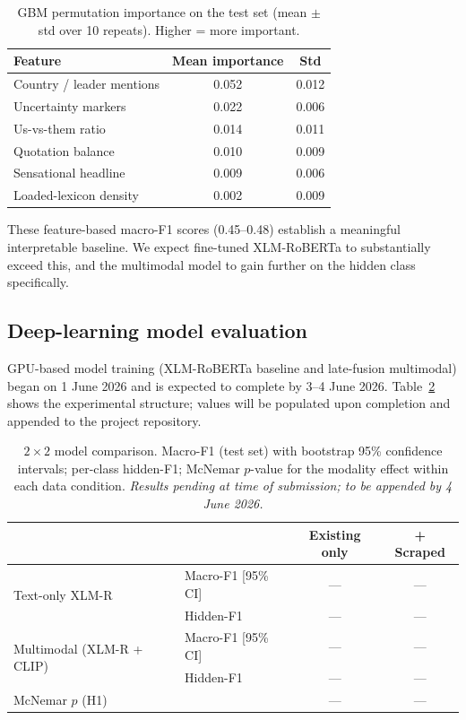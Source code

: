 \documentclass[12pt,a4paper]{article}
\begin{document}
\begin{table}[H]
\centering
\caption{GBM permutation importance on the test set (mean $\pm$ std over 10
repeats). Higher = more important.}
\label{tab:permutation}
\begin{tabular}{lcc}
\toprule
Feature & Mean importance & Std \\
\midrule
Country / leader mentions & 0.052 & 0.012 \\
Uncertainty markers       & 0.022 & 0.006 \\
Us-vs-them ratio          & 0.014 & 0.011 \\
Quotation balance         & 0.010 & 0.009 \\
Sensational headline      & 0.009 & 0.006 \\
Loaded-lexicon density    & 0.002 & 0.009 \\
\bottomrule
\end{tabular}
\end{table}

These feature-based macro-F1 scores (0.45--0.48) establish a meaningful
interpretable baseline.
We expect fine-tuned XLM-RoBERTa to substantially exceed this, and the
multimodal model to gain further on the hidden class specifically.

\subsection{Deep-learning model evaluation}

GPU-based model training (XLM-RoBERTa baseline and late-fusion multimodal)
began on 1 June 2026 and is expected to complete by 3--4 June 2026.
Table~\ref{tab:results} shows the experimental structure; values will be
populated upon completion and appended to the project repository.

\begin{table}[H]
\centering
\caption{$2{\times}2$ model comparison. Macro-F1 (test set) with bootstrap 95\%
confidence intervals; per-class hidden-F1; McNemar $p$-value for the modality
effect within each data condition.
\emph{Results pending at time of submission; to be appended by 4 June 2026.}}
\label{tab:results}
\begin{tabular}{llcc}
\toprule
 & & \textbf{Existing only} & \textbf{+ Scraped} \\
\midrule
\multirow{2}{*}{Text-only XLM-R}
  & Macro-F1 [95\%\,CI] & --- & --- \\
  & Hidden-F1           & --- & --- \\[4pt]
\multirow{2}{*}{Multimodal (XLM-R + CLIP)}
  & Macro-F1 [95\%\,CI] & --- & --- \\
  & Hidden-F1           & --- & --- \\[4pt]
McNemar $p$ (H1) & & --- & --- \\
\bottomrule
\end{tabular}
\end{table}
\end{document}
